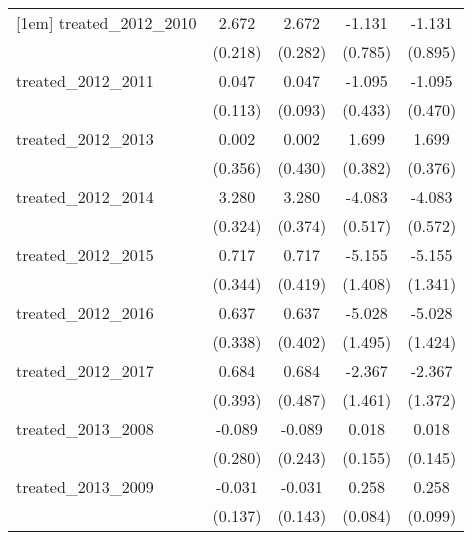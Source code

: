 {\begin{tabular}{l*{4}{c}}
[1em]
treated\_2012\_2010&       2.672\sym{***}&       2.672\sym{***}&      -1.131         &      -1.131         \\
            &     (0.218)         &     (0.282)         &     (0.785)         &     (0.895)         \\
[1em]
treated\_2012\_2011&       0.047         &       0.047         &      -1.095\sym{*}  &      -1.095\sym{*}  \\
            &     (0.113)         &     (0.093)         &     (0.433)         &     (0.470)         \\
[1em]
treated\_2012\_2013&       0.002         &       0.002         &       1.699\sym{***}&       1.699\sym{***}\\
            &     (0.356)         &     (0.430)         &     (0.382)         &     (0.376)         \\
[1em]
treated\_2012\_2014&       3.280\sym{***}&       3.280\sym{***}&      -4.083\sym{***}&      -4.083\sym{***}\\
            &     (0.324)         &     (0.374)         &     (0.517)         &     (0.572)         \\
[1em]
treated\_2012\_2015&       0.717\sym{*}  &       0.717         &      -5.155\sym{***}&      -5.155\sym{***}\\
            &     (0.344)         &     (0.419)         &     (1.408)         &     (1.341)         \\
[1em]
treated\_2012\_2016&       0.637         &       0.637         &      -5.028\sym{***}&      -5.028\sym{***}\\
            &     (0.338)         &     (0.402)         &     (1.495)         &     (1.424)         \\
[1em]
treated\_2012\_2017&       0.684         &       0.684         &      -2.367         &      -2.367         \\
            &     (0.393)         &     (0.487)         &     (1.461)         &     (1.372)         \\
[1em]
treated\_2013\_2008&      -0.089         &      -0.089         &       0.018         &       0.018         \\
            &     (0.280)         &     (0.243)         &     (0.155)         &     (0.145)         \\
[1em]
treated\_2013\_2009&      -0.031         &      -0.031         &       0.258\sym{**} &       0.258\sym{**} \\
            &     (0.137)         &     (0.143)         &     (0.084)         &     (0.099)         \\

\end{tabular}}
